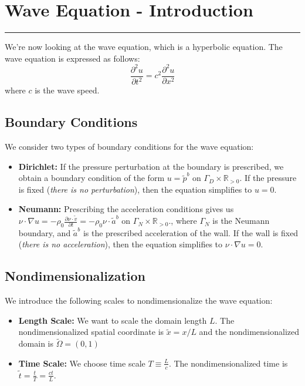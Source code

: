 \documentclass[11pt]{article}
\newcommand{\R}{\mathbb{R}}
\begin{document}
\section{Wave Equation - Introduction }
\hrule \vspace{15pt}

We're now looking at the wave equation, which is a hyperbolic equation. The wave equation is expressed as follows:
$$ \frac{\partial^2 u}{\partial t^2} = c^2 \frac{\partial^2 u}{\partial x^2} $$
where $c$ is the wave speed. 

\subsection{Boundary Conditions}
We consider two types of boundary conditions for the wave equation:
\begin{itemize}
\item \textbf{Dirichlet:} If the pressure perturbation at the boundary is prescribed, we obtain a boundary condition of the form $u=\tilde{p}^b$ on $\Gamma_D \times \R_{>0}$.  If the pressure is fixed (\textit{there is no perturbation}), then the equation simplifies to $u = 0$.
\item \textbf{Neumann:} Prescribing the acceleration conditions gives us $\nu \cdot \nabla u = -\rho_0 \frac{\partial \nu \cdot \tilde{v}}{\partial t} = -\rho_0 \nu \cdot \tilde{a}^b$ on $\Gamma_N \times \R_{>0}$., where $\Gamma_N$ is the Neumann boundary, and $ \tilde{a}^b$ is the prescribed acceleration of the wall. If the wall is fixed (\textit{there is no acceleration}), then the equation simplifies to $\nu \cdot \nabla u = 0$.
\end{itemize}

\subsection{Nondimensionalization}
We introduce the following scales to nondimensionalize the wave equation:
\begin{itemize}
\item \textbf{Length Scale:} We want to scale the domain length $L$. The nondimensionalized spatial coordinate is $\tilde{x} = x/L$ and the nondimensionalized domain is $\tilde{\Omega}  = (0, 1)$
\item \textbf{Time Scale:} We choose time scale $T \equiv \frac{L}{c}$. The nondimensionalized time is $\tilde{t} = \frac{t}{T}= \frac{ct}{L}$.
\end{itemize}
\end{document}
